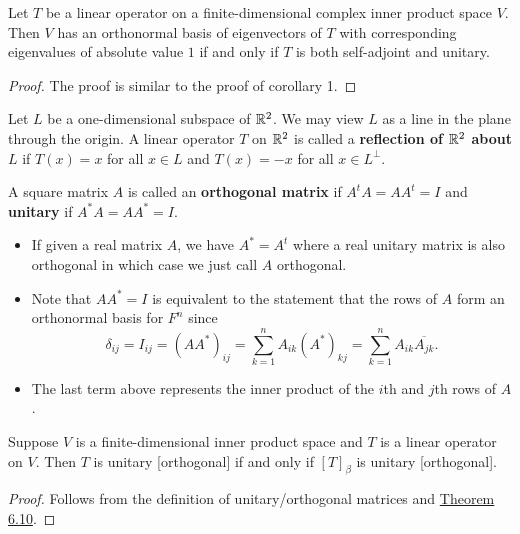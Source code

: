 \begin{corollary}
    Let \( T  \) be a linear operator on a finite-dimensional complex inner product space \( V  \). Then \( V  \) has an orthonormal basis of eigenvectors of \( T  \) with corresponding eigenvalues of absolute value \( 1  \) if and only if \( T  \) is both self-adjoint and unitary.
\end{corollary}

\begin{proof}
    The proof is similar to the proof of corollary 1.
\end{proof}

\begin{definition}
    Let \( L  \) be a one-dimensional subspace of \( \mathbb{R}^{2} \). We may view \( L  \) as a line in the plane through the origin. A linear operator \( T  \) on \( \mathbb{R}^{2} \) is called a \textbf{reflection of \( \mathbb{R}^{2} \) about \( L  \)} if \( T(x) = x  \) for all \( x \in L  \) and \( T(x) = -x  \) for all \( x \in L^{\perp} \).
\end{definition}

\begin{definition}
    A square matrix \( A  \) is called an \textbf{orthogonal matrix} if \( A^{t} A = A A^{t} = I  \) and \textbf{unitary} if \( A^{*} A = A A^{*} = I  \).
\end{definition}

\begin{itemize}
    \item If given a real matrix \( A  \), we have \( A^{*} = A^{t} \) where a real unitary matrix is also orthogonal in which case we just call \( A  \) orthogonal.
    \item Note that \( A A^{*} = I  \) is equivalent to the statement that the rows of \( A  \) form an orthonormal basis for \( F^{n} \) since
        \[  {\delta}_{ij} = {I}_{ij} = (AA^{*})_{ij} = \sum_{ k=1  }^{ n } {A}_{ik } {(A^{*})}_{kj} = \sum_{ k=1  }^{ n } {A}_{ik} \overline{{A}_{jk}}. \]
    \item The last term above represents the inner product of the \( i \)th and \( j \)th rows of \( A  \).
\end{itemize}

\begin{prop}
    Suppose \( V  \) is a finite-dimensional inner product space and \( T  \) is a linear operator on \( V  \). Then \( T  \) is unitary [orthogonal] if and only if \( [T]_{\beta} \) is unitary [orthogonal]. 
\end{prop}
\begin{proof}
    Follows from the definition of unitary/orthogonal matrices and {\hyperref[Theorem 6.10]{Theorem 6.10}}.
\end{proof}

